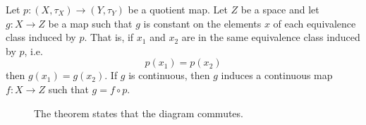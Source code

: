     \begin{theorem}
      Let $p: (X, \tau_X )\rightarrow (Y, \tau_Y)$ be a quotient map. Let $Z$ be a space and let $g: X \rightarrow Z$ be a map such that $g$ is constant on the elements $x$ of each equivalence class induced by $p$. That is, if $x_1$ and $x_2$ are in the same equivalence class induced by $p$, i.e. 
      \begin{equation}
        p(x_1) = p(x_2)
      \end{equation}
      then $g(x_1) = g(x_2)$. If $g$ is continuous, then $g$ induces a continuous map $f: X \rightarrow Z$ such that $g = f \circ p$. 

      \begin{figure}[H]
        \centering 
        \caption{The theorem states that the diagram commutes. } 
        \label{fig:quotient_continuity}
      \end{figure}

    \end{theorem}

